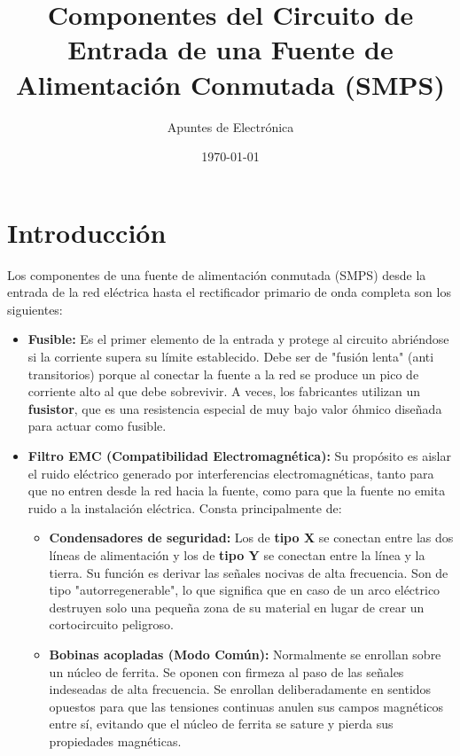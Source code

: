 \documentclass[12pt, a4paper]{article}
\begin{document}
\title{\textbf{Componentes del Circuito de Entrada de una Fuente de Alimentación Conmutada (SMPS)}}
\author{Apuntes de Electrónica}
\date{\today}
\maketitle

\section*{Introducción}
Los componentes de una fuente de alimentación conmutada (SMPS) desde la entrada de la red eléctrica hasta el rectificador primario de onda completa son los siguientes:

\begin{itemize}[itemsep=1.5ex]
    \item \textbf{Fusible:} Es el primer elemento de la entrada y protege al circuito abriéndose si la corriente supera su límite establecido. Debe ser de "fusión lenta" (anti transitorios) porque al conectar la fuente a la red se produce un pico de corriente alto al que debe sobrevivir. A veces, los fabricantes utilizan un \textbf{fusistor}, que es una resistencia especial de muy bajo valor óhmico diseñada para actuar como fusible.
    
    \item \textbf{Filtro EMC (Compatibilidad Electromagnética):} Su propósito es aislar el ruido eléctrico generado por interferencias electromagnéticas, tanto para que no entren desde la red hacia la fuente, como para que la fuente no emita ruido a la instalación eléctrica. Consta principalmente de:
    \begin{itemize}[itemsep=1ex, topsep=1ex]
        \item \textbf{Condensadores de seguridad:} Los de \textbf{tipo X} se conectan entre las dos líneas de alimentación y los de \textbf{tipo Y} se conectan entre la línea y la tierra. Su función es derivar las señales nocivas de alta frecuencia. Son de tipo "autorregenerable", lo que significa que en caso de un arco eléctrico destruyen solo una pequeña zona de su material en lugar de crear un cortocircuito peligroso.
        \item \textbf{Bobinas acopladas (Modo Común):} Normalmente se enrollan sobre un núcleo de ferrita. Se oponen con firmeza al paso de las señales indeseadas de alta frecuencia. Se enrollan deliberadamente en sentidos opuestos para que las tensiones continuas anulen sus campos magnéticos entre sí, evitando que el núcleo de ferrita se sature y pierda sus propiedades magnéticas.
    \end{itemize}


\end{itemize}
\end{document}

